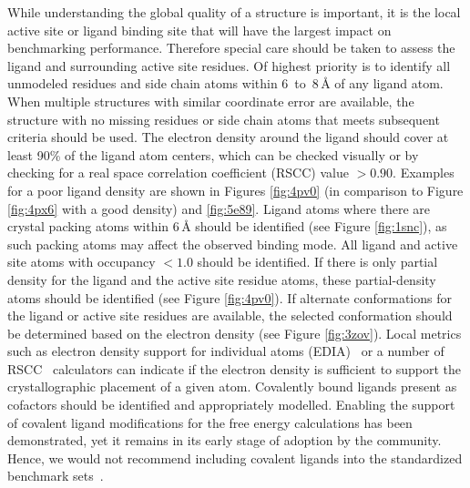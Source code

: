 \documentclass[9pt,bestpractices,pubversion]{livecoms}
\begin{document}
While understanding the global quality of a structure is important, it is the local active site or ligand binding site that will have the largest impact on benchmarking performance. Therefore special care should be taken to assess the ligand and surrounding active site residues. 
%
Of highest priority is to identify all unmodeled residues and side chain atoms within 6~to~$8\,$\AA{} of any ligand atom. When multiple structures with similar coordinate error are available, the structure with no missing residues or side chain atoms that meets subsequent criteria should be used.
%
The electron density around the ligand should cover at least 90\% of the ligand atom centers, which can be checked visually or by checking for a real space correlation coefficient (RSCC) value $>0.90$. Examples for a poor ligand density are shown in Figures \ref{fig:4pv0} (in comparison to Figure \ref{fig:4px6} with a good density) and \ref{fig:5e89}. Ligand atoms where there are crystal packing atoms within $6\,$\AA{} should be identified (see Figure \ref{fig:1snc}), as such packing atoms may affect the observed binding mode. 
%
All ligand and active site atoms with occupancy $<1.0$ should be identified.
%
If there is only partial density for the ligand and the active site residue atoms, these partial-density atoms should be identified (see Figure \ref{fig:4pv0}). If alternate conformations for the ligand or active site residues are available, the selected conformation should be determined based on the electron density (see Figure \ref{fig:3zov}). Local metrics such as electron density support for individual atoms (EDIA)~\cite{meyder_estimating_2017} or a number of RSCC~\cite{tickle_statistical_2012} calculators can indicate if the electron density is sufficient to support the crystallographic placement of a given atom.
%
Covalently bound ligands present as cofactors should be identified and appropriately modelled.	Enabling the support of covalent ligand modifications for the free energy calculations has been demonstrated, yet it remains in its early stage of
 adoption by the community. Hence, we would not recommend including covalent ligands into the standardized benchmark sets~\cite{yu_toward_2019}.
\end{document}
